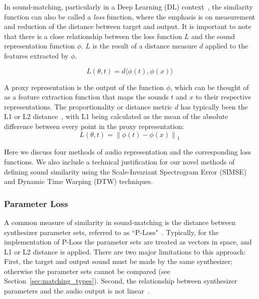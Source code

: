 In sound-matching, particularly in a Deep Learning (\gls{DL}) context~\cite{goodfellow2016deep}, the similarity function can also be called a \textit{loss} function, where the emphasis is on measurement and reduction of the distance between target and output. It is important to note that there is a close relationship between the loss function $L$ and the sound representation function $\phi$. $L$ is the result of a distance measure $d$ applied to the features extracted by $\phi$. 

\[
L(\theta, t) = d\langle\phi(t),\phi(x)\rangle
\]

\noindent

A proxy representation is the output of the function \( \phi \), which can be thought of as a feature extraction function that maps the sounds \( t \) and \( x \) to their respective representations. 
The proportionality or distance metric $d$ has typically been the L1 or L2 distance~\cite{turian2020sorry,richard2025model}, with L1 being calculated as the mean of the absolute difference between every point in the proxy representation:
\[
L(\theta, t) = \left\| \phi(t) - \phi(x) \right\|_1
\]

Here we discuss four methods of audio representation and the corresponding loss functions. We also include a technical justification for our novel methods of defining sound similarity using the Scale-Invariant Spectrogram Error (SIMSE) and Dynamic Time Warping (DTW) techniques. 

\subsubsection{Parameter Loss}
A common measure of similarity in sound-matching is the distance between synthesizer parameter sets, referred to as ``P-Loss"~\cite{han2023perceptual}. Typically, for the implementation of P-Loss the parameter sets are treated as vectors in space, and L1 or L2 distance is applied. There are two major limitations to this approach: First, the target and output sound must be made by the same synthesizer; otherwise the parameter sets cannot be compared (see Section~\ref{sec:matching_types}). Second, the relationship between synthesizer parameters and the audio output is not linear~\cite{shier2020spiegelib,han2023perceptual,esling2019flow}. 

